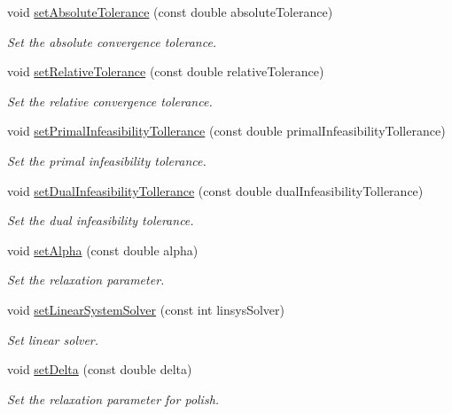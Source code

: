 \begin{DoxyCompactItemize}
void \mbox{\hyperlink{classOsqpEigen_1_1Settings_a4498f6973031eadb2ad94b60dc856651}{set\+Absolute\+Tolerance}} (const double absolute\+Tolerance)
\begin{DoxyCompactList}\small\item\em Set the absolute convergence tolerance. \end{DoxyCompactList}\item 
void \mbox{\hyperlink{classOsqpEigen_1_1Settings_aabf457998cd2b4ba6c6e61036a04de1e}{set\+Relative\+Tolerance}} (const double relative\+Tolerance)
\begin{DoxyCompactList}\small\item\em Set the relative convergence tolerance. \end{DoxyCompactList}\item 
void \mbox{\hyperlink{classOsqpEigen_1_1Settings_aa56c63231442a3d6ebc2d78fccec2aab}{set\+Primal\+Infeasibility\+Tollerance}} (const double primal\+Infeasibility\+Tollerance)
\begin{DoxyCompactList}\small\item\em Set the primal infeasibility tolerance. \end{DoxyCompactList}\item 
void \mbox{\hyperlink{classOsqpEigen_1_1Settings_a466e7884ef5dfe331f4c1fdc3382d7bb}{set\+Dual\+Infeasibility\+Tollerance}} (const double dual\+Infeasibility\+Tollerance)
\begin{DoxyCompactList}\small\item\em Set the dual infeasibility tolerance. \end{DoxyCompactList}\item 
void \mbox{\hyperlink{classOsqpEigen_1_1Settings_a141f192237f68447ac898a222bb3c1c9}{set\+Alpha}} (const double alpha)
\begin{DoxyCompactList}\small\item\em Set the relaxation parameter. \end{DoxyCompactList}\item 
void \mbox{\hyperlink{classOsqpEigen_1_1Settings_a42e2f3d0fcf93c0a22ba2bb30599c1d3}{set\+Linear\+System\+Solver}} (const int linsys\+Solver)
\begin{DoxyCompactList}\small\item\em Set linear solver. \end{DoxyCompactList}\item 
void \mbox{\hyperlink{classOsqpEigen_1_1Settings_a7a3e8d416f71d7fc572482d24a9a8ba2}{set\+Delta}} (const double delta)
\begin{DoxyCompactList}\small\item\em Set the relaxation parameter for polish. \end{DoxyCompactList}\item 

\end{DoxyCompactItemize}
